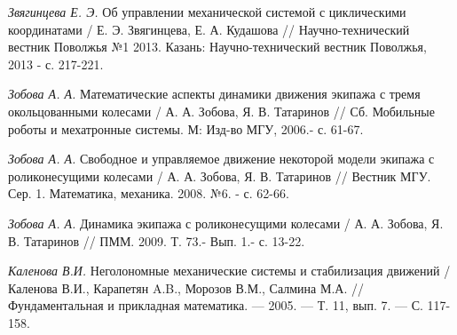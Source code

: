 \begin{thebibliography}{10}
	
	
	{\it Звягинцева Е. Э.} Об управлении механической системой с циклическими координатами / Е. Э. Звягинцева, Е. А. Кудашова //
	Научно-технический вестник Поволжья №1 2013. Казань: Научно-технический вестник Поволжья, 2013 - с. 217-221.
	
	
	{\it Зобова А. А.} Математические аспекты динамики движения экипажа с тремя окольцованными колесами / А. А. Зобова, Я. В. Татаринов //
	Сб. Мобильные роботы и мехатронные системы. М: Изд-во МГУ, 2006.- с. 61-67.
	
	{\it Зобова А. А.} Свободное и управляемое движение некоторой модели экипажа с роликонесущими колесами / А. А. Зобова, Я. В. Татаринов //
	Вестник МГУ. Сер. 1. Математика, механика. 2008. №6. - с. 62-66.
	
	{\it Зобова А. А.} Динамика экипажа с роликонесущими колесами / А. А. Зобова, Я. В. Татаринов //
	ПММ. 2009. Т. 73.- Вып. 1.- с. 13-22.
	
	{\it Каленова В.И.} Неголономные механические системы и стабилизация движений / Каленова В.И., Карапетян A.B., Морозов В.М., Салмина М.А. // Фундаментальная и прикладная математика. — 2005. — Т. 11, вып. 7. — С. 117-158.
	

\end{thebibliography}
